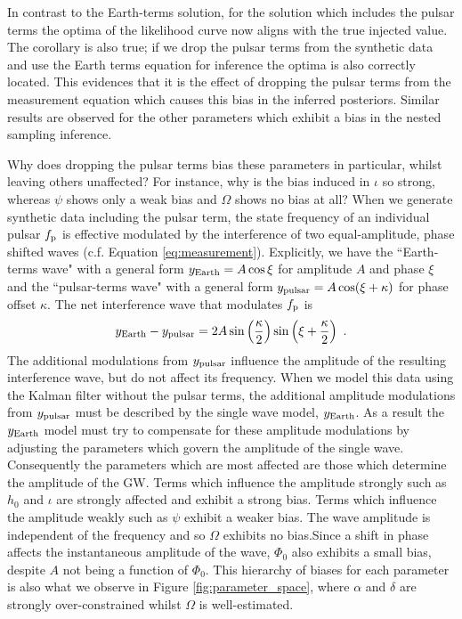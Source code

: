 \documentclass[fleqn,usenatbib,useAMS]{mnras}
\begin{document}
In contrast to the Earth-terms solution, for the solution which includes the pulsar terms the optima of the likelihood curve now aligns with the true injected value. The corollary is also true; if we drop the pulsar terms from the synthetic data and use the Earth terms equation for inference the optima is also correctly located. This evidences that it is the effect of dropping the pulsar terms from the measurement equation which causes this bias in the inferred posteriors. Similar results are observed for the other parameters which exhibit a bias in the nested sampling inference. \newline 

Why does dropping the pulsar terms bias these parameters in particular, whilst leaving others unaffected? For instance, why is the bias induced in $\iota$ so strong, whereas $\psi$ shows only a weak bias and  $\Omega$ shows no bias at all? When we generate synthetic data including the pulsar term, the state frequency of an individual pulsar $f_{\rm p}$ is effective modulated by the interference of two equal-amplitude, phase shifted waves (c.f. Equation \ref{eq:measurement}). Explicitly, we have the ``Earth-terms wave" with a general form $y_{\rm Earth} = A \cos \xi$ for amplitude $A$ and phase $\xi$ and the ``pulsar-terms wave" with a general form $y_{\rm pulsar} = A \cos (\xi + \kappa)$ for phase offset $\kappa$. The net interference wave that modulates $f_{\rm p}$ is 
\begin{eqnarray}
	y_{\rm Earth} - y_{\rm pulsar} = 2 A \sin \left(\frac{\kappa}{2}\right) \sin \left(\xi + \frac{\kappa}{2}\right) \ .
\end{eqnarray}
The additional modulations from $y_{\rm pulsar}$ influence the amplitude of the resulting interference wave, but do not affect its frequency. When we model this data using the Kalman filter without the pulsar terms, the additional amplitude modulations from $y_{\rm pulsar}$ must be described by the single wave model, $y_{\rm Earth}$. As a result the $y_{\rm Earth}$ model must try to compensate for these amplitude modulations by adjusting the parameters which govern the amplitude of the single wave. Consequently the parameters which are most affected are those which determine the amplitude of the GW. Terms which influence the amplitude strongly such as $h_0$ and $\iota$ are strongly affected and exhibit a strong bias. Terms which influence the amplitude weakly such as $\psi$ exhibit a weaker bias. The wave amplitude is independent of the frequency and so $\Omega$ exhibits no bias.Since a shift in phase affects the instantaneous amplitude of the wave, $\Phi_0$ also exhibits a small bias, despite $A$ not being a function of $\Phi_0$. This hierarchy of biases for each parameter is also what we observe in Figure \ref{fig:parameter_space}, where $\alpha$ and $\delta$ are strongly over-constrained whilst $\Omega$ is well-estimated. \newline  
\end{document}
